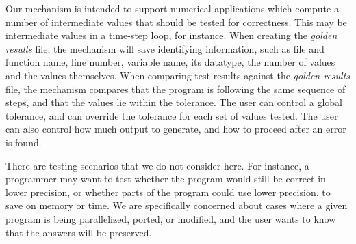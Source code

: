 Our mechanism is intended to support numerical applications which compute a number of intermediate values that should be tested for correctness.
This may be intermediate values in a time-step loop, for instance.
When creating the \emph{golden results} file, the mechanism will save identifying information, such as file and function name, line number, variable name, its datatype, the number of values and the values themselves.
When comparing test results against the \emph{golden results} file, the mechanism compares that the program is following the same sequence of steps, and that the values lie within the tolerance.
The user can control a global tolerance, and can override the tolerance for each set of values tested.
The user can also control how much output to generate, and how to proceed after an error is found.

There are testing scenarios that we do not consider here.
For instance, a programmer may want to test whether the program would still be correct in lower precision, or whether parts of the program could use lower precision, to save on memory or time.
We are specifically concerned about cases where a given program is being parallelized, ported, or modified, and the user wants to know that the answers will be preserved.

